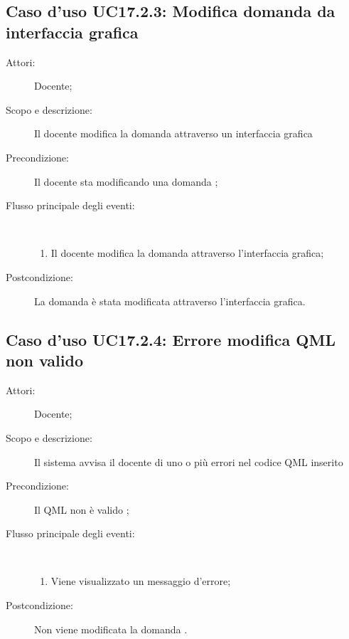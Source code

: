 \subsection{Caso d'uso UC17.2.3: Modifica domanda da interfaccia grafica}\begin{description}
	\item[Attori:] Docente;
	\item[Scopo e descrizione:] Il docente modifica la domanda attraverso un interfaccia grafica
	
	\item[Precondizione:] Il docente sta modificando una domanda
	;
	
	\item[Flusso principale degli eventi:] \ 
	\begin{enumerate}
		\item Il docente modifica la domanda attraverso l'interfaccia grafica;
		
	\end{enumerate}
	\item[Postcondizione:] La domanda è stata modificata attraverso l'interfaccia grafica.
\end{description}
\hypertarget{UC17.2.4}{}
\subsection{Caso d'uso UC17.2.4: Errore modifica QML non valido}\begin{description}
	\item[Attori:] Docente;
	\item[Scopo e descrizione:] Il sistema avvisa il docente di uno o più errori nel codice QML inserito
	
	\item[Precondizione:] Il QML non è valido
	;
	
	\item[Flusso principale degli eventi:] \ 
	\begin{enumerate}
		\item Viene visualizzato un messaggio d'errore;
		
	\end{enumerate}
	\item[Postcondizione:] Non viene modificata la domanda
	.
\end{description}
\hypertarget{UC17.2.5}{}
